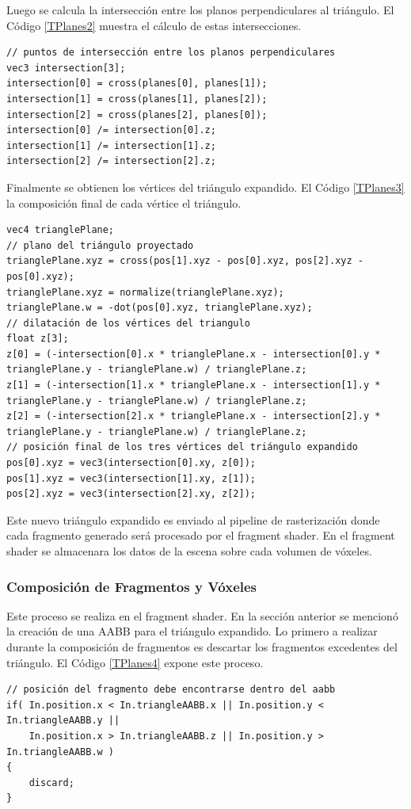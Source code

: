 Luego se calcula la intersección entre los planos perpendiculares al triángulo. El Código \ref{TPlanes2} muestra el cálculo de estas intersecciones.
\\
\begin{lstlisting}[caption={Intersección entre planos perpendiculares al triángulo proyectado.}, label=TPlanes2]
// puntos de intersección entre los planos perpendiculares
vec3 intersection[3];
intersection[0] = cross(planes[0], planes[1]);
intersection[1] = cross(planes[1], planes[2]);
intersection[2] = cross(planes[2], planes[0]);
intersection[0] /= intersection[0].z;
intersection[1] /= intersection[1].z;
intersection[2] /= intersection[2].z;
\end{lstlisting}

Finalmente se obtienen los vértices del triángulo expandido. El Código \ref{TPlanes3} la composición final de cada vértice el triángulo.
\\
\begin{lstlisting}[caption={Vértices del triángulo expandido.}, label=TPlanes3]
vec4 trianglePlane;
// plano del triángulo proyectado
trianglePlane.xyz = cross(pos[1].xyz - pos[0].xyz, pos[2].xyz - pos[0].xyz);
trianglePlane.xyz = normalize(trianglePlane.xyz);
trianglePlane.w = -dot(pos[0].xyz, trianglePlane.xyz);
// dilatación de los vértices del triangulo
float z[3];
z[0] = (-intersection[0].x * trianglePlane.x - intersection[0].y * trianglePlane.y - trianglePlane.w) / trianglePlane.z;
z[1] = (-intersection[1].x * trianglePlane.x - intersection[1].y * trianglePlane.y - trianglePlane.w) / trianglePlane.z;
z[2] = (-intersection[2].x * trianglePlane.x - intersection[2].y * trianglePlane.y - trianglePlane.w) / trianglePlane.z;
// posición final de los tres vértices del triángulo expandido
pos[0].xyz = vec3(intersection[0].xy, z[0]);
pos[1].xyz = vec3(intersection[1].xy, z[1]);
pos[2].xyz = vec3(intersection[2].xy, z[2]);
\end{lstlisting}

Este nuevo triángulo expandido es enviado al pipeline de rasterización donde cada fragmento generado será procesado por el fragment shader. En el fragment shader se almacenara los datos de la escena sobre cada volumen de vóxeles.

\subsubsection{Composición de Fragmentos y Vóxeles}

Este proceso se realiza en el fragment shader. En la sección anterior se mencionó la creación de una \ac{AABB} para el triángulo expandido. Lo primero a realizar durante la composición de fragmentos es descartar los fragmentos excedentes del triángulo. El Código \ref{TPlanes4} expone este proceso.
\\
\begin{lstlisting}[caption={Descarte de fragmentos excedentes en el fragment shader.}, label=TPlanes4]
// posición del fragmento debe encontrarse dentro del aabb
if( In.position.x < In.triangleAABB.x || In.position.y < In.triangleAABB.y || 
	In.position.x > In.triangleAABB.z || In.position.y > In.triangleAABB.w )
{
	discard;
}
\end{lstlisting}

